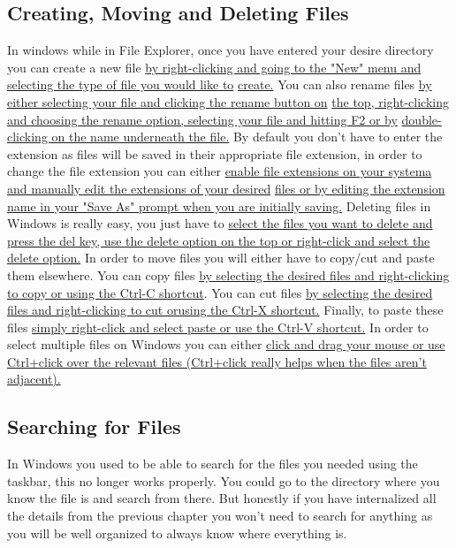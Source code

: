 \documentclass[11pt]{article}
\begin{document}
\subsection{Creating, Moving and Deleting Files}
\label{sec:orgd4f4e7f}
In windows while in File Explorer, once you have entered your desire directory you can create a new
file \uline{by right-clicking and going to the "New" menu and selecting the type of file you would like to}
\uline{create.} You can also rename files \uline{by either selecting your file and clicking the rename button on}
\uline{the top, right-clicking and choosing the rename option, selecting your file and hitting F2 or by}
\uline{double-clicking on the name underneath the file.} By default you don't have to enter the extension as
files will be saved in their appropriate file extension, in order to change the file extension you
can either \uline{enable file extensions on your systema and manually edit the extensions of your desired}
\uline{files or by editing the extension name in your "Save As" prompt when you are initially saving.}
Deleting files in Windows is really easy, you just have to \uline{select the files you want to delete and}
\uline{press the del key, use the delete option on the top or right-click and select the delete option.}
In order to move files you will either have to copy/cut and paste them elsewhere. You can copy files
\uline{by selecting the desired files and right-clicking to copy or using the Ctrl-C shortcut}. You can cut
files \uline{by selecting the desired files and right-clicking to cut orusing the Ctrl-X shortcut.} Finally,
to paste these files \uline{simply right-click and select paste or use the Ctrl-V shortcut.}
In order to select multiple files on Windows you can either \uline{click and drag your mouse or use}
\uline{Ctrl+click over the relevant files (Ctrl+click really helps when the files aren't adjacent).}
\subsection{Searching for Files}
\label{sec:org8281f61}
In Windows you used to be able to search for the files you needed using the taskbar, this no longer
works properly. You could go to the directory where you know the file is and search from there. But honestly
if you have internalized all the details from the previous chapter you won't need to search for
anything as you will be well organized to always know where everything is.
\end{document}
